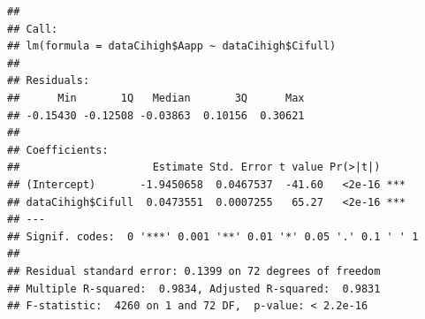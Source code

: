 \documentclass[
]{krantz}
\makeatletter
\newenvironment{Shaded}{\begin{snugshade}}{\end{snugshade}}
\newcommand{\DecValTok}[1]{\textcolor[rgb]{0.00,0.00,0.81}{#1}}
\newcommand{\FunctionTok}[1]{\textcolor[rgb]{0.00,0.00,0.00}{#1}}
\newcommand{\NormalTok}[1]{#1}
\newcommand{\OtherTok}[1]{\textcolor[rgb]{0.56,0.35,0.01}{#1}}
\newcommand{\SpecialCharTok}[1]{\textcolor[rgb]{0.00,0.00,0.00}{#1}}
\newenvironment{kframe}{%
\medskip{}
\setlength{\fboxsep}{.8em}
 \def\at@end@of@kframe{}%
 \ifinner\ifhmode%
  \def\at@end@of@kframe{\end{minipage}}%
  \begin{minipage}{\columnwidth}%
 \fi\fi%
 \def\FrameCommand##1{\hskip\@totalleftmargin \hskip-\fboxsep
 \colorbox{shadecolor}{##1}\hskip-\fboxsep
     \hskip-\linewidth \hskip-\@totalleftmargin \hskip\columnwidth}%
 \MakeFramed {\advance\hsize-\width
   \@totalleftmargin\z@ \linewidth\hsize
   \@setminipage}}%
 {\par\unskip\endMakeFramed%
 \at@end@of@kframe}
\renewenvironment{Shaded}{\begin{kframe}}{\end{kframe}}
\makeatother
\begin{document}
\begin{Shaded}
\end{Shaded}

\begin{verbatim}
## 
## Call:
## lm(formula = dataCihigh$Aapp ~ dataCihigh$Cifull)
## 
## Residuals:
##      Min       1Q   Median       3Q      Max 
## -0.15430 -0.12508 -0.03863  0.10156  0.30621 
## 
## Coefficients:
##                     Estimate Std. Error t value Pr(>|t|)    
## (Intercept)       -1.9450658  0.0467537  -41.60   <2e-16 ***
## dataCihigh$Cifull  0.0473551  0.0007255   65.27   <2e-16 ***
## ---
## Signif. codes:  0 '***' 0.001 '**' 0.01 '*' 0.05 '.' 0.1 ' ' 1
## 
## Residual standard error: 0.1399 on 72 degrees of freedom
## Multiple R-squared:  0.9834, Adjusted R-squared:  0.9831 
## F-statistic:  4260 on 1 and 72 DF,  p-value: < 2.2e-16
\end{verbatim}
\end{document}
